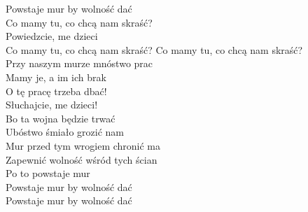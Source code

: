  Powstaje mur by wolność dać
\hops
{}\\
Co mamy tu, co chcą nam skraść?\\
Powiedzcie, me dzieci\\
Co mamy tu, co chcą nam skraść?
\hops
{} Co mamy tu, co chcą nam skraść?\\
 Przy naszym murze mnóstwo prac\\
 Mamy je, a im ich brak
\hops
{}\\
O tę pracę trzeba dbać!\\
Słuchajcie, me dzieci!\\
Bo ta wojna będzie trwać\\
\hops
{} Ubóstwo śmiało grozić nam\\
 Mur przed tym wrogiem chronić ma\\
 Zapewnić wolność wśród tych ścian\\
 Po to powstaje mur\\
 Powstaje mur by wolność dać\\
 Powstaje mur by wolność dać

